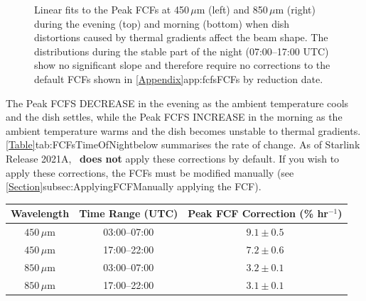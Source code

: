 \begin{figure}
\begin{center}
\caption[FCFs Time of Night Fits]{Linear fits to the Peak FCFs at 450\,$\mu$m (left) and 850\,$\mu$m (right)
 during the evening (top) and morning (bottom) when dish distortions caused by thermal gradients affect the
 beam shape. The distributions during the stable part of the night (07:00--17:00 UTC) show no significant
 slope and therefore require no corrections to the default FCFs shown in
 \cref{Appendix}{app:fcfs}{FCFs by reduction date}. \label{fig:FCFsTimeOfNightFits}}
\end{center}
\end{figure}


The Peak FCFS DECREASE in the evening as the ambient temperature cools and the dish settles, while
the Peak FCFS INCREASE in the morning as the ambient temperature warms and the dish becomes
unstable to thermal gradients. \cref{Table}{tab:FCFsTimeOfNight}{below} summarises the rate of change.
As of Starlink Release 2021A, \oracdr\ \textbf{does not} apply these corrections by default. If
you wish to apply these corrections, the FCFs must be modified manually (see
\cref{Section}{subsec:ApplyingFCF}{Manually applying the FCF}).


\begin{table}[h!]
\begin{center}
\begin{tabular}{|c|c|c|}
 \hline
 \multicolumn{1}{|c|}{Wavelength} &
 \multicolumn{1}{c|}{Time Range (UTC)} &
 \multicolumn{1}{c|}{Peak FCF Correction (\% hr$^{-1}$)}
 \\ \hline
$450\,\mu$m & 03:00--07:00 & $9.1\pm0.5$ \\
$450\,\mu$m & 17:00--22:00 & $7.2\pm0.6$ \\
\hline
$850\,\mu$m & 03:00--07:00 & $3.2\pm0.1$ \\
$850\,\mu$m & 17:00--22:00 & $3.1\pm0.1$ \\ \hline
\end{tabular}
\end{center}
\label{tab:FCFsTimeOfNight}
\end{table}

